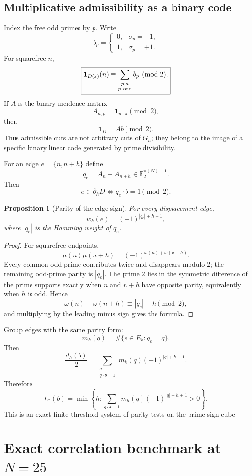 \documentclass[11pt]{article}
\newtheorem{proposition}[theorem]{Proposition}
\newcommand{\Ftwo}{\mathbb F_2}
\begin{document}
\subsection{Multiplicative admissibility as a binary code}

Index the free odd primes by $p$.  Write
\[
 b_p=
 \begin{cases}
 0,&\sigma_p=-1,\\
 1,&\sigma_p=+1.
 \end{cases}
\]
For squarefree $n$,
\[
 \boxed{
 \mathbf1_{D(x)}(n)
 \equiv\sum_{\substack{p\mid n\\p\ {\rm odd}}}b_p
 \pmod2.
 }
\]
If $A$ is the binary incidence matrix
\[
 A_{n,p}=\mathbf1_{p\mid n}\pmod2,
\]
then
\[
 \boxed{\mathbf1_D=Ab\pmod2.}
\]
Thus admissible cuts are not arbitrary cuts of $G_h$; they belong to the image of a specific binary linear code generated by prime divisibility.

For an edge $e=\{n,n+h\}$ define
\[
 \boxed{
 q_e=A_n+A_{n+h}\in\Ftwo^{\pi(N)-1}.
 }
\]
Then
\[
 e\in\partial_hD
 \iff q_e\cdot b=1\pmod2.
\]

\begin{proposition}[Parity of the edge sign]
For every displacement edge,
\[
 \boxed{
 w_h(e)=(-1)^{|q_e|+h+1},
 }
\]
where $|q_e|$ is the Hamming weight of $q_e$.
\end{proposition}

\begin{proof}
For squarefree endpoints,
\[
 \mu(n)\mu(n+h)=(-1)^{\omega(n)+\omega(n+h)}.
\]
Every common odd prime contributes twice and disappears modulo $2$; the remaining odd-prime parity is $|q_e|$.  The prime $2$ lies in the symmetric difference of the prime supports exactly when $n$ and $n+h$ have opposite parity, equivalently when $h$ is odd.  Hence
\[
 \omega(n)+\omega(n+h)\equiv |q_e|+h\pmod2,
\]
and multiplying by the leading minus sign gives the formula.
\end{proof}

Group edges with the same parity form:
\[
 m_h(q)=\#\{e\in E_h:q_e=q\}.
\]
Then
\[
 \boxed{
 \frac{d_h(b)}2
 =
 \sum_{\substack{q\\q\cdot b=1}}
 m_h(q)(-1)^{|q|+h+1}.
 }
\]
Therefore
\[
 \boxed{
 h_*(b)=
 \min\left\{
 h:
 \sum_{q\cdot b=1}
 m_h(q)(-1)^{|q|+h+1}>0
 \right\}.
 }
\]
This is an exact finite threshold system of parity tests on the prime-sign cube.

\section{Exact correlation benchmark at $N=25$}
\end{document}
